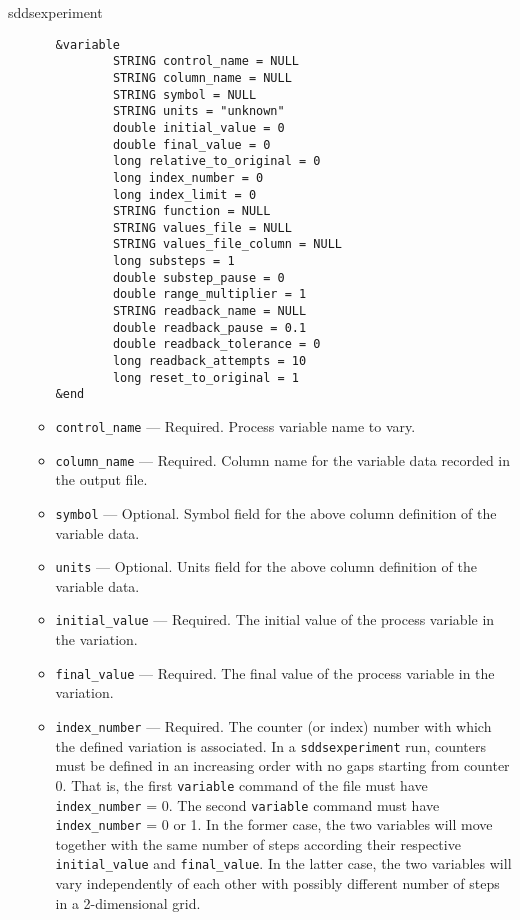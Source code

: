 \begin{sddsprog}{sddsexperiment}
\begin{itemize}
\begin{itemize}
\begin{verbatim}
&variable
        STRING control_name = NULL
        STRING column_name = NULL
        STRING symbol = NULL
        STRING units = "unknown"
        double initial_value = 0
        double final_value = 0
        long relative_to_original = 0
        long index_number = 0
        long index_limit = 0
        STRING function = NULL
        STRING values_file = NULL
        STRING values_file_column = NULL
        long substeps = 1
        double substep_pause = 0
        double range_multiplier = 1
        STRING readback_name = NULL
        double readback_pause = 0.1
        double readback_tolerance = 0
        long readback_attempts = 10
        long reset_to_original = 1
&end
\end{verbatim}
    \item {\verb+control_name+} --- Required. Process variable name to vary.
    \item {\verb+column_name+} --- Required. Column name for the variable data recorded in the output file.
    \item {\verb+symbol+} --- Optional. Symbol field for the above column definition of the variable data.
    \item {\verb+units+} --- Optional. Units field for the above column definition of the variable data.
    \item {\verb+initial_value+} --- Required. The initial value of the process variable in the variation.
    \item {\verb+final_value+} --- Required. The final value of the process variable in the variation.
    \item {\verb+index_number+} --- Required. The counter (or index) number with which
                the defined variation is associated. In a \verb+sddsexperiment+ run, counters must
                be defined in an increasing order with no gaps starting from counter 0. That is,
                the first {\verb+variable+} command of the
                file must have {\verb+index_number+} = 0. The second {\verb+variable+} command
                must have {\verb+index_number+} = 0 or 1. In the former case, the two variables
                will move together with the same number of steps according their respective
                {\verb+initial_value+} and {\verb+final_value+}. In the latter
                case, the two variables will vary independently of each other with possibly different
                number of steps in a 2-dimensional grid.


\end{itemize}
\end{itemize}
\end{sddsprog}
